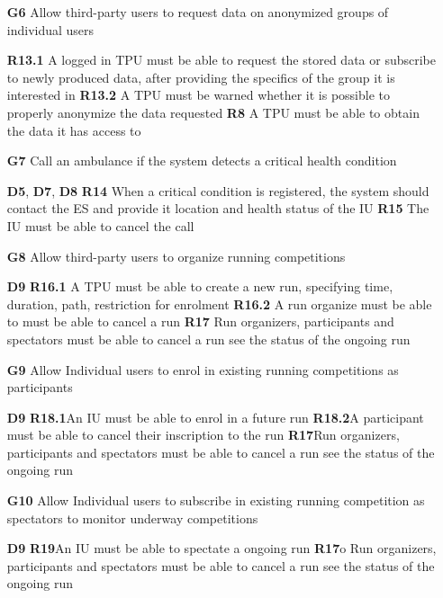 \begin{itemize}
\item [\textbf{G6}] Allow third-party users to request data on anonymized groups of individual users

\subitem \textbf{R13.1} A logged in TPU must be able to request the stored data or subscribe to newly produced data, after providing the specifics of the group it is interested in
\subitem \textbf{R13.2} A TPU must be warned whether it is possible to properly anonymize the data requested
\subitem \textbf{R8} A TPU must be able to obtain the data it has access to 

\item [\textbf{G7}] Call an ambulance if the system detects a critical health condition

\subitem \textbf{D5}, \textbf{D7}, \textbf{D8}
\subitem \textbf{R14} When a critical condition is registered, the system should contact the ES and provide it location and health status of the IU
\subitem \textbf{R15} The IU must be able to cancel the call

\item [\textbf{G8}] Allow third-party users to organize running competitions

\subitem \textbf{D9}
\subitem \textbf{R16.1} A TPU must be able to create a new run, specifying time, duration, path, restriction for enrolment
\subitem \textbf{R16.2} A run organize must be able to must be able to cancel a run 
\subitem \textbf{R17} Run organizers, participants and spectators must be able to cancel a run see the status of the ongoing run

\item [\textbf{G9}] Allow Individual users to enrol in existing running competitions as participants

\subitem \textbf{D9}
\subitem \textbf{R18.1}An IU must be able to enrol in a future run
\subitem \textbf{R18.2}A participant must be able to cancel their inscription to the run 
\subitem \textbf{R17}Run organizers, participants and spectators must be able to cancel a run see the status of the ongoing run

\item [\textbf{G10}] Allow Individual users to subscribe in existing running competition as spectators to monitor underway competitions

\subitem \textbf{D9}
\subitem \textbf{R19}An IU must be able to spectate a ongoing run 
\subitem \textbf{R17}o	Run organizers, participants and spectators must be able to cancel a run see the status of the ongoing run
\end{itemize}
